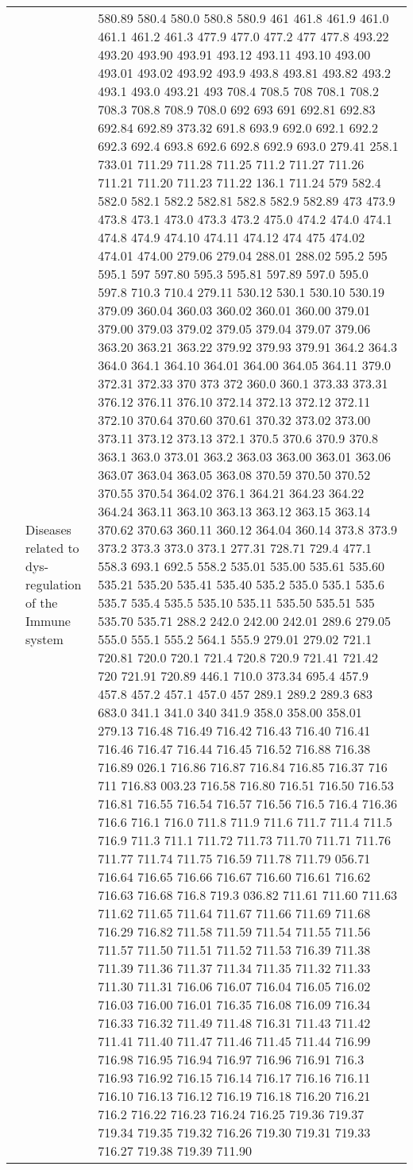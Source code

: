 \begin{longtable}{|L{.1in}|L{.6in}||L{5.65in}|}
    & Diseases related to dys-regulation of the Immune system &   580.89 580.4 580.0 580.8 580.9 461 461.8 461.9 461.0 461.1 461.2 461.3 477.9 477.0 477.2 477 477.8 493.22 493.20 493.90 493.91 493.12 493.11 493.10 493.00 493.01 493.02 493.92 493.9 493.8 493.81 493.82 493.2 493.1 493.0 493.21 493 708.4 708.5 708 708.1 708.2 708.3 708.8 708.9 708.0 692 693 691 692.81 692.83 692.84 692.89 373.32 691.8 693.9 692.0 692.1 692.2 692.3 692.4 693.8 692.6 692.8 692.9 693.0 279.41 258.1 733.01 711.29 711.28 711.25 711.2 711.27 711.26 711.21 711.20 711.23 711.22 136.1 711.24 579 582.4 582.0 582.1 582.2 582.81 582.8 582.9 582.89 473 473.9 473.8 473.1 473.0 473.3 473.2 475.0 474.2 474.0 474.1 474.8 474.9 474.10 474.11 474.12 474 475 474.02 474.01 474.00 279.06 279.04 288.01 288.02 595.2 595 595.1 597 597.80 595.3 595.81 597.89 597.0 595.0 597.8 710.3 710.4 279.11 530.12 530.1 530.10 530.19 379.09 360.04 360.03 360.02 360.01 360.00 379.01 379.00 379.03 379.02 379.05 379.04 379.07 379.06 363.20 363.21 363.22 379.92 379.93 379.91 364.2 364.3 364.0 364.1 364.10 364.01 364.00 364.05 364.11 379.0 372.31 372.33 370 373 372 360.0 360.1 373.33 373.31 376.12 376.11 376.10 372.14 372.13 372.12 372.11 372.10 370.64 370.60 370.61 370.32 373.02 373.00 373.11 373.12 373.13 372.1 370.5 370.6 370.9 370.8 363.1 363.0 373.01 363.2 363.03 363.00 363.01 363.06 363.07 363.04 363.05 363.08 370.59 370.50 370.52 370.55 370.54 364.02 376.1 364.21 364.23 364.22 364.24 363.11 363.10 363.13 363.12 363.15 363.14 370.62 370.63 360.11 360.12 364.04 360.14 373.8 373.9 373.2 373.3 373.0 373.1 277.31 728.71 729.4 477.1 558.3 693.1 692.5 558.2 535.01 535.00 535.61 535.60 535.21 535.20 535.41 535.40 535.2 535.0 535.1 535.6 535.7 535.4 535.5 535.10 535.11 535.50 535.51 535 535.70 535.71 288.2 242.0 242.00 242.01 289.6 279.05 555.0 555.1 555.2 564.1 555.9 279.01 279.02 721.1 720.81 720.0 720.1 721.4 720.8 720.9 721.41 721.42 720 721.91 720.89 446.1 710.0 373.34 695.4 457.9 457.8 457.2 457.1 457.0 457 289.1 289.2 289.3 683 683.0 341.1 341.0 340 341.9 358.0 358.00 358.01 279.13 716.48 716.49 716.42 716.43 716.40 716.41 716.46 716.47 716.44 716.45 716.52 716.88 716.38 716.89 026.1 716.86 716.87 716.84 716.85 716.37 716 711 716.83 003.23 716.58 716.80 716.51 716.50 716.53 716.81 716.55 716.54 716.57 716.56 716.5 716.4 716.36 716.6 716.1 716.0 711.8 711.9 711.6 711.7 711.4 711.5 716.9 711.3 711.1 711.72 711.73 711.70 711.71 711.76 711.77 711.74 711.75 716.59 711.78 711.79 056.71 716.64 716.65 716.66 716.67 716.60 716.61 716.62 716.63 716.68 716.8 719.3 036.82 711.61 711.60 711.63 711.62 711.65 711.64 711.67 711.66 711.69 711.68 716.29 716.82 711.58 711.59 711.54 711.55 711.56 711.57 711.50 711.51 711.52 711.53 716.39 711.38 711.39 711.36 711.37 711.34 711.35 711.32 711.33 711.30 711.31 716.06 716.07 716.04 716.05 716.02 716.03 716.00 716.01 716.35 716.08 716.09 716.34 716.33 716.32 711.49 711.48 716.31 711.43 711.42 711.41 711.40 711.47 711.46 711.45 711.44 716.99 716.98 716.95 716.94 716.97 716.96 716.91 716.3 716.93 716.92 716.15 716.14 716.17 716.16 716.11 716.10 716.13 716.12 716.19 716.18 716.20 716.21 716.2 716.22 716.23 716.24 716.25 719.36 719.37 719.34 719.35 719.32 716.26 719.30 719.31 719.33 716.27 719.38 719.39 711.90 
\end{longtable}

